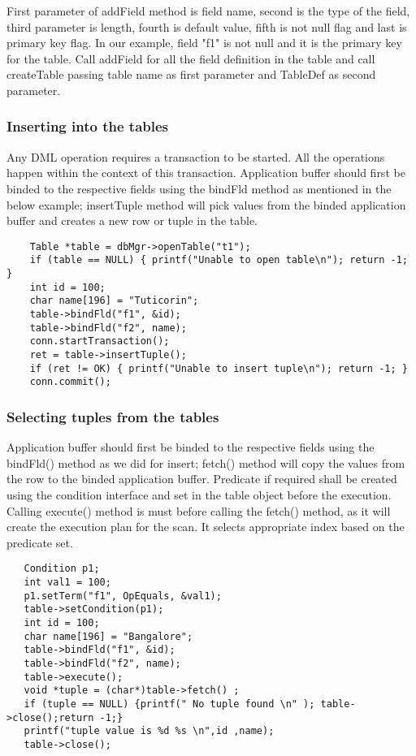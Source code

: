 \documentclass[12pt]{article}
\begin{document}
First parameter of addField method is field name, second is the type of the field, third parameter is length, fourth is default value, fifth is not null flag and last is primary key flag.
In our example, field "f1" is not null and it is the primary key for the table.
Call addField for all the field definition in the table and call createTable passing table name as first parameter and TableDef as second parameter.

\subsubsection{Inserting into the tables}
\label{inserttable}
Any DML operation requires a transaction to be started. All the operations happen within the context of this transaction.
Application buffer should first be binded to the respective fields using the bindFld method as mentioned in the below example; insertTuple method will pick values from the binded application buffer and creates a new row or tuple in the table.
\begin{verbatim}
    Table *table = dbMgr->openTable("t1");
    if (table == NULL) { printf("Unable to open table\n"); return -1; }
    int id = 100;
    char name[196] = "Tuticorin";
    table->bindFld("f1", &id);
    table->bindFld("f2", name);
    conn.startTransaction();
    ret = table->insertTuple();
    if (ret != OK) { printf("Unable to insert tuple\n"); return -1; }
    conn.commit();
\end{verbatim}

\subsubsection{Selecting tuples from the tables}
\label{seltable}
Application buffer should first be binded to the respective fields using the bindFld() method as we did for insert; fetch() method will copy the values from the row to the binded application buffer.
Predicate if required shall be created using the condition interface and set in the table object before the execution. Calling execute() method is must before calling the fetch() method, as it will create the execution plan for the scan. It selects appropriate index based on the predicate set.

\begin{verbatim}
   Condition p1;
   int val1 = 100;
   p1.setTerm("f1", OpEquals, &val1);
   table->setCondition(p1);
   int id = 100;
   char name[196] = "Bangalore";
   table->bindFld("f1", &id);
   table->bindFld("f2", name);
   table->execute();
   void *tuple = (char*)table->fetch() ;
   if (tuple == NULL) {printf(" No tuple found \n" ); table->close();return -1;}
   printf("tuple value is %d %s \n",id ,name);
   table->close();
\end{verbatim}
  
\end{document}
